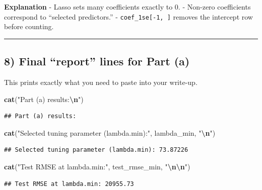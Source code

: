\documentclass[
]{article}
\newenvironment{Shaded}{\begin{snugshade}}{\end{snugshade}}
\newcommand{\FunctionTok}[1]{\textcolor[rgb]{0.13,0.29,0.53}{\textbf{#1}}}
\newcommand{\NormalTok}[1]{#1}
\newcommand{\SpecialCharTok}[1]{\textcolor[rgb]{0.81,0.36,0.00}{\textbf{#1}}}
\newcommand{\StringTok}[1]{\textcolor[rgb]{0.31,0.60,0.02}{#1}}
\begin{document}
\textbf{Explanation} - Lasso sets many coefficients exactly to 0. -
Non-zero coefficients correspond to ``selected predictors.'' -
\texttt{coef\_1se{[}-1,\ {]}} removes the intercept row before counting.

\begin{center}\rule{0.5\linewidth}{0.5pt}\end{center}

\subsection{8) Final ``report'' lines for Part
(a)}\label{final-report-lines-for-part-a}

This prints exactly what you need to paste into your write-up.

\begin{Shaded}
\begin{Highlighting}[]
\FunctionTok{cat}\NormalTok{(}\StringTok{"Part (a) results:}\SpecialCharTok{\textbackslash{}n}\StringTok{"}\NormalTok{)}
\end{Highlighting}
\end{Shaded}

\begin{verbatim}
## Part (a) results:
\end{verbatim}

\begin{Shaded}
\begin{Highlighting}[]
\FunctionTok{cat}\NormalTok{(}\StringTok{"Selected tuning parameter (lambda.min):"}\NormalTok{, lambda\_min, }\StringTok{"}\SpecialCharTok{\textbackslash{}n}\StringTok{"}\NormalTok{)}
\end{Highlighting}
\end{Shaded}

\begin{verbatim}
## Selected tuning parameter (lambda.min): 73.87226
\end{verbatim}

\begin{Shaded}
\begin{Highlighting}[]
\FunctionTok{cat}\NormalTok{(}\StringTok{"Test RMSE at lambda.min:"}\NormalTok{, test\_rmse\_min, }\StringTok{"}\SpecialCharTok{\textbackslash{}n\textbackslash{}n}\StringTok{"}\NormalTok{)}
\end{Highlighting}
\end{Shaded}

\begin{verbatim}
## Test RMSE at lambda.min: 20955.73
\end{verbatim}
\end{document}
